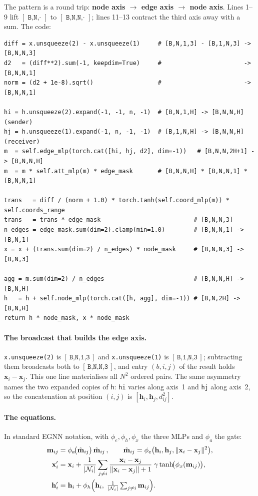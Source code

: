 \documentclass[11pt,a4paper]{article}
\newcommand{\shape}[1]{\ensuremath{[\,\texttt{#1}\,]}}
\newcommand{\code}[1]{\texttt{#1}}
\newcommand{\bx}{\mathbf{x}}
\newcommand{\bh}{\mathbf{h}}
\begin{document}
\noindent
The pattern is a round trip: \textbf{node axis $\to$ edge axis $\to$ node axis}.
Lines 1--9 lift \shape{B,N,$\cdot$} to \shape{B,N,N,$\cdot$}; lines 11--13
contract the third axis away with a sum. The code:

\begin{lstlisting}[caption={\code{EquivariantConv.forward}}]
diff = x.unsqueeze(2) - x.unsqueeze(1)     # [B,N,1,3] - [B,1,N,3] -> [B,N,N,3]
d2   = (diff**2).sum(-1, keepdim=True)     #                       -> [B,N,N,1]
norm = (d2 + 1e-8).sqrt()                  #                       -> [B,N,N,1]

hi = h.unsqueeze(2).expand(-1, -1, n, -1)  # [B,N,1,H] -> [B,N,N,H]   (sender)
hj = h.unsqueeze(1).expand(-1, n, -1, -1)  # [B,1,N,H] -> [B,N,N,H]   (receiver)
m  = self.edge_mlp(torch.cat([hi, hj, d2], dim=-1))   # [B,N,N,2H+1] -> [B,N,N,H]
m  = m * self.att_mlp(m) * edge_mask       # [B,N,N,H] * [B,N,N,1] * [B,N,N,1]

trans   = diff / (norm + 1.0) * torch.tanh(self.coord_mlp(m)) * self.coords_range
trans   = trans * edge_mask                          # [B,N,N,3]
n_edges = edge_mask.sum(dim=2).clamp(min=1.0)        # [B,N,N,1] -> [B,N,1]
x = x + (trans.sum(dim=2) / n_edges) * node_mask     # [B,N,N,3] -> [B,N,3]

agg = m.sum(dim=2) / n_edges                         # [B,N,N,H] -> [B,N,H]
h   = h + self.node_mlp(torch.cat([h, agg], dim=-1)) # [B,N,2H] -> [B,N,H]
return h * node_mask, x * node_mask
\end{lstlisting}

\paragraph{The broadcast that builds the edge axis.} \code{x.unsqueeze(2)} is
\shape{B,N,1,3} and \code{x.unsqueeze(1)} is \shape{B,1,N,3}; subtracting them
broadcasts both to \shape{B,N,N,3}, and entry $(b,i,j)$ of the result holds
$\bx_i-\bx_j$. This one line materialises all $N^2$ ordered pairs. The same
asymmetry names the two expanded copies of \code{h}: \code{hi} varies along
axis~1 and \code{hj} along axis~2, so the concatenation at position $(i,j)$ is
$[\bh_i,\bh_j,d^2_{ij}]$.

\paragraph{The equations.} In standard EGNN notation, with $\phi_e,\phi_h,\phi_x$
the three MLPs and $\phi_a$ the gate:
\begin{align}
  \mathbf{m}_{ij} &= \phi_a\!\bigl(\tilde{\mathbf{m}}_{ij}\bigr)\,\tilde{\mathbf{m}}_{ij}\,,
    \qquad \tilde{\mathbf{m}}_{ij} = \phi_e\bigl(\bh_i,\bh_j,\lVert\bx_i-\bx_j\rVert^2\bigr), \\
  \bx_i' &= \bx_i + \frac{1}{|\mathcal{N}_i|}\sum_{j\neq i}
            \frac{\bx_i-\bx_j}{\lVert\bx_i-\bx_j\rVert+1}\;
            \gamma\tanh\!\bigl(\phi_x(\mathbf{m}_{ij})\bigr), \\
  \bh_i' &= \bh_i + \phi_h\Bigl(\bh_i,\;\tfrac{1}{|\mathcal{N}_i|}\textstyle\sum_{j\neq i}\mathbf{m}_{ij}\Bigr).
\end{align}
\end{document}

